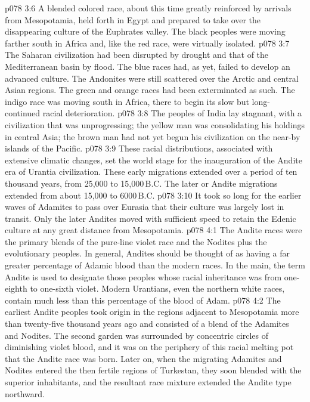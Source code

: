 \vs p078 3:6 A blended colored race, about this time greatly reinforced by arrivals from Mesopotamia, held forth in Egypt and prepared to take over the disappearing culture of the Euphrates valley. The black peoples were moving farther south in Africa and, like the red race, were virtually isolated.
\vs p078 3:7 The Saharan civilization had been disrupted by drought and that of the Mediterranean basin by flood. The blue races had, as yet, failed to develop an advanced culture. The Andonites were still scattered over the Arctic and central Asian regions. The green and orange races had been exterminated as such. The indigo race was moving south in Africa, there to begin its slow but long\hyp{}continued racial deterioration.
\vs p078 3:8 The peoples of India lay stagnant, with a civilization that was unprogressing; the yellow man was consolidating his holdings in central Asia; the brown man had not yet begun his civilization on the near\hyp{}by islands of the Pacific.
\vs p078 3:9 \pc These racial distributions, associated with extensive climatic changes, set the world stage for the inauguration of the Andite era of Urantia civilization. These early migrations extended over a period of ten thousand years, from 25,000 to 15,000\,B.C. The later or Andite migrations extended from about 15,000 to 6000\,B.C.
\vs p078 3:10 It took so long for the earlier waves of Adamites to pass over Eurasia that their culture was largely lost in transit. Only the later Andites moved with sufficient speed to retain the Edenic culture at any great distance from Mesopotamia.
\vs p078 4:1 The Andite races were the primary blends of the pure\hyp{}line violet race and the Nodites plus the evolutionary peoples. In general, Andites should be thought of as having a far greater percentage of Adamic blood than the modern races. In the main, the term Andite is used to designate those peoples whose racial inheritance was from one\hyp{}eighth to one\hyp{}sixth violet. Modern Urantians, even the northern white races, contain much less than this percentage of the blood of Adam.
\vs p078 4:2 The earliest Andite peoples took origin in the regions adjacent to Mesopotamia more than twenty\hyp{}five thousand years ago and consisted of a blend of the Adamites and Nodites. The second garden was surrounded by concentric circles of diminishing violet blood, and it was on the periphery of this racial melting pot that the Andite race was born. Later on, when the migrating Adamites and Nodites entered the then fertile regions of Turkestan, they soon blended with the superior inhabitants, and the resultant race mixture extended the Andite type northward.
